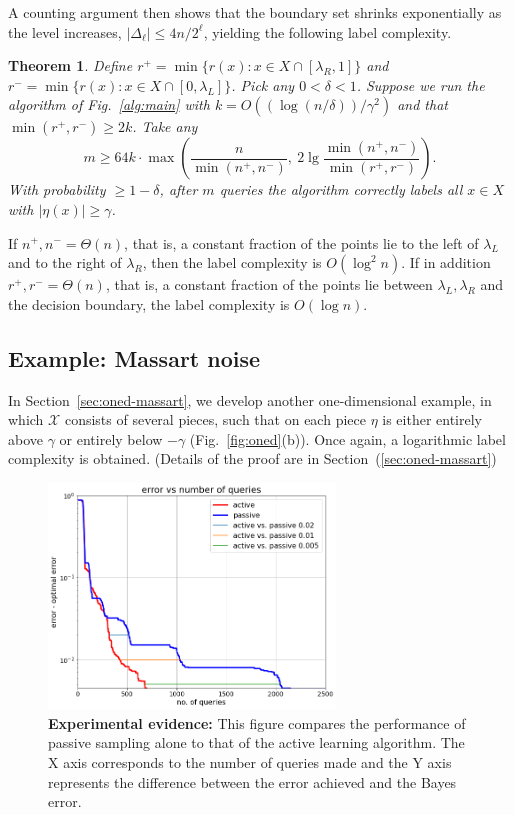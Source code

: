 \documentclass[twoside]{article}
\def\X{{\mathcal X}}
\newtheorem{thm}{Theorem}
\begin{document}
A counting argument then shows that the boundary set shrinks exponentially as the level increases, $|\Delta_\ell| \leq 4n/2^\ell$, yielding the following label complexity. 
\begin{thm}
Define $r^+ = \min \{r(x): x \in X \cap [\lambda_R,1]\}$ and $r^- = \min \{r(x): x \in X \cap [0,\lambda_L]\}$. Pick any $0 < \delta < 1$. Suppose we run the algorithm of Fig.~\ref{alg:main} with $k = O((\log (n/\delta))/\gamma^2)$ and that $\min(r^+, r^-) \geq 2k$.  Take any 
$$ m \geq 64k \cdot \max \left( \frac{n}{\min(n^+,n^-)}, \ 2 \lg \frac{\min(n^+,n^-)}{\min(r^+,r^-)} \right) .$$
With probability $\geq 1-\delta$, after $m$ queries the algorithm correctly labels all $x \in X$ with $|\eta(x)| \geq \gamma$.
\label{thm:oned-monotonic}
\end{thm}
If $n^+, n^- = \Theta(n)$, that is, a constant fraction of the points lie to the left of $\lambda_L$ and to the right of $\lambda_R$, then the label complexity is $O(\log^2 n)$. If in addition $r^+, r^- = \Theta(n)$, that is, a constant fraction of the points lie between $\lambda_L, \lambda_R$ and the decision boundary, the label complexity is $O(\log n)$. 

\subsection{Example: Massart noise}
\label{sec:example-massart}

In Section~\ref{sec:oned-massart}, we develop another one-dimensional example, in which $\X$ consists of several pieces, such that on each piece $\eta$ is either entirely above $\gamma$ or entirely below $-\gamma$ (Fig.~\ref{fig:oned}(b)). Once again, a logarithmic label complexity is obtained. (Details of the proof are in Section~(\ref{sec:oned-massart})

\begin{figure}
\begin{center}
\includegraphics[width=3in]{figures/MassartExperiment5.png}
\end{center}
\caption{{\bf Experimental evidence:} This figure compares the
  performance of passive sampling alone to that of the active learning
  algorithm. The X axis corresponds to the number of queries made and the
  Y axis represents the difference between the error achieved and the
  Bayes error.}
\label{fig:Experiments}
\end{figure}
\end{document}
